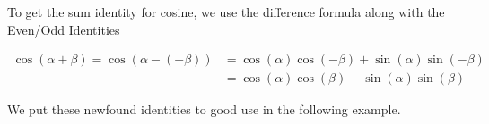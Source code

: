 To get the sum identity for cosine, we use the difference formula along with the Even/Odd Identities

\begin{align*}
\cos(\alpha + \beta) = \cos(\alpha - (-\beta)) &= \cos(\alpha) \cos(-\beta) + \sin(\alpha) \sin(-\beta)\\
& = \cos(\alpha) \cos(\beta) - \sin(\alpha) \sin(\beta)
\end{align*}

We put these newfound identities to good use in the following example.

\medskip

